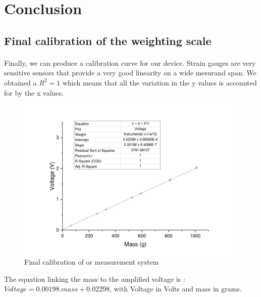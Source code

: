 \documentclass{article}[12pt]
\begin{document}
\section{Conclusion}
\subsection{Final calibration of the weighting scale}
\paragraph{}
Finally, we can produce a calibration curve for our device. Strain gauges are very sensitive sensors that provide a very good linearity on a wide mesurand span. We obtained a $R^2=1$ which means that all the variation in the y values is accounted for by the x values. 
\begin{figure}[H]
    \centering
    \includegraphics[width=.8\textwidth]{figures/calibr.pdf}
    \caption{Final calibration of or measurement system}
    \label{fig:final_calibration}
\end{figure}
The equation linking the mass to the amplified voltage is : $Voltage = 0.00198.mass+0.02298$, with Voltage in Volts and mass in grams.
\newpage
\end{document}

